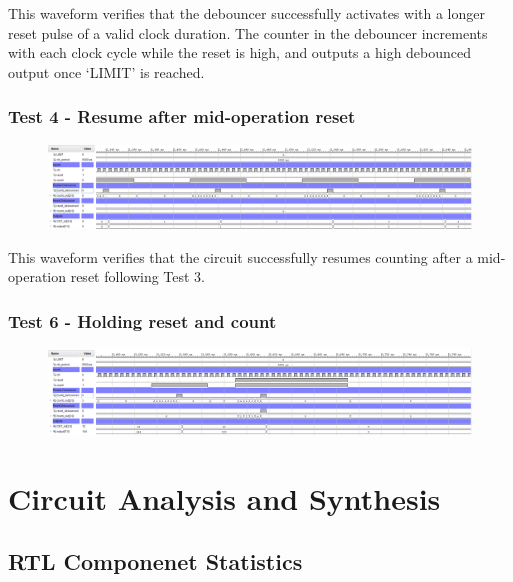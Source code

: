 \documentclass[11pt]{report}
\begin{document}
This waveform verifies that the debouncer successfully activates with a longer reset pulse of a valid clock duration. The counter in the debouncer increments with each clock cycle while the reset is high, and outputs a high debounced output once `LIMIT' is reached.

\subsubsection*{Test 4 - Resume after mid-operation reset}
\begin{figure}[H]
    \includegraphics[width=\columnwidth]{Reports/Lab1/Waveforms/07_resume-after-mid-operation-reset.png}
\end{figure}
This waveform verifies that the circuit successfully resumes counting after a mid-operation reset following Test 3.

\subsubsection*{Test 6 - Holding reset and count}
\begin{figure}[H]
    \includegraphics[width=\columnwidth]{Reports/Lab1/Waveforms/08_holding-reset-and-count.png}
\end{figure}




\section*{Circuit Analysis and Synthesis}

\subsection*{RTL Componenet Statistics}
\inputminted[firstline=65,lastline=76]{text}{../../Lab1/Lab1.runs/synth_1/fibonacci_8bit_sequence.vds}
\end{document}
